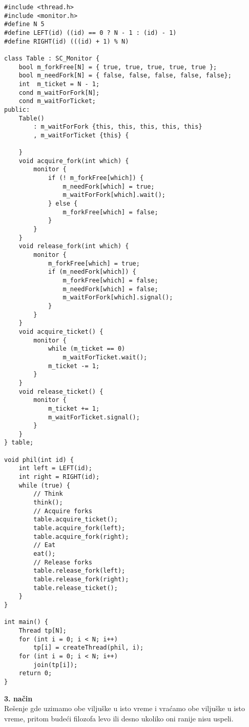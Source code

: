 \begin{lstlisting}
#include <thread.h>
#include <monitor.h>
#define N 5
#define LEFT(id) ((id) == 0 ? N - 1 : (id) - 1)
#define RIGHT(id) (((id) + 1) % N)

class Table : SC_Monitor {
    bool m_forkFree[N] = { true, true, true, true, true };
    bool m_needFork[N] = { false, false, false, false, false};
    int  m_ticket = N - 1;
    cond m_waitForFork[N];
    cond m_waitForTicket;
public:
    Table() 
        : m_waitForFork {this, this, this, this, this}
        , m_waitForTicket {this} {
        
    }
    void acquire_fork(int which) {
        monitor {
            if (! m_forkFree[which]) {
                m_needFork[which] = true;
                m_waitForFork[which].wait();
            } else {
                m_forkFree[which] = false;
            }
        }
    }
    void release_fork(int which) {
        monitor {
            m_forkFree[which] = true;
            if (m_needFork[which]) {
                m_forkFree[which] = false;
                m_needFork[which] = false;
                m_waitForFork[which].signal();
            }
        }
    }
    void acquire_ticket() {
        monitor {
            while (m_ticket == 0)
                m_waitForTicket.wait();
            m_ticket -= 1;
        }
    }
    void release_ticket() {
        monitor {
            m_ticket += 1;
            m_waitForTicket.signal();
        }
    }
} table;

void phil(int id) {
    int left = LEFT(id);
    int right = RIGHT(id);
    while (true) {
        // Think
        think();
        // Acquire forks
        table.acquire_ticket();
        table.acquire_fork(left);
        table.acquire_fork(right);
        // Eat
        eat();
        // Release forks
        table.release_fork(left);
        table.release_fork(right);
        table.release_ticket();
    }
}

int main() {
    Thread tp[N];
    for (int i = 0; i < N; i++) 
        tp[i] = createThread(phil, i);
    for (int i = 0; i < N; i++) 
        join(tp[i]);
    return 0;
}

\end{lstlisting}
\clearpage
\textbf{\large 3. na\v{c}in}\\
Re\v{s}enje gde uzimamo obe vilju\v{s}ke u isto vreme i vra\'{c}amo obe vilju\v{s}ke u isto vreme, pritom bude\'{c}i filozofa levo ili desno ukoliko oni ranije nisu uspeli.
\\\\
